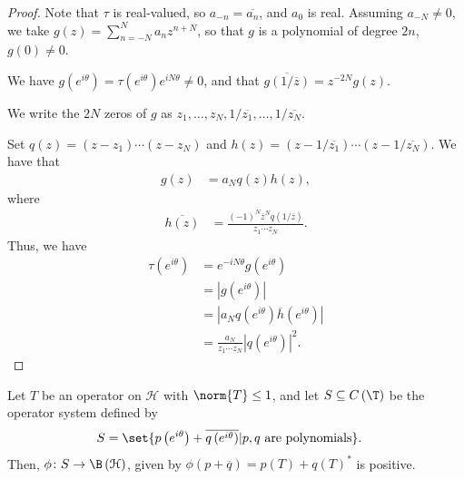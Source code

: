 \documentclass[10pt]{mypackage}
\begin{document}
\begin{proof}
  Note that $\tau$ is real-valued, so $a_{-n} = \overline{a_n}$, and $a_0$ is real. Assuming $a_{-N} \neq 0$, we take $g(z) = \sum_{n=-N}^{N}a_nz^{n+N}$, so that $g$ is a polynomial of degree $2n$, $g(0)\neq 0$.\newline

  We have $g\left( e^{i\theta} \right) = \tau\left( e^{i\theta} \right)e^{iN\theta}\neq 0$, and that $\overline{g\left( 1/\overline{z} \right)} = z^{-2N}g(z)$.\newline

  We write the $2N$ zeros of $g$ as $z_1,\dots,z_N,1/\overline{z_1},\dots,1/\overline{z_N}$.\newline

  Set $q(z) = \left( z-z_1 \right)\cdots \left( z-z_N \right)$ and $h(z) = \left( z-1/\overline{z_1} \right)\cdots \left( z-1/\overline{z_N} \right)$. We have that
  \begin{align*}
    g(z) &= a_Nq(z)h(z),
  \end{align*}
  where
  \begin{align*}
    \overline{h(z)} &= \frac{\left( -1 \right)^N\overline{z}^Nq\left( 1/\overline{z} \right)}{z_1\cdots z_N}.
  \end{align*}
  Thus, we have
  \begin{align*}
    \tau\left( e^{i\theta} \right) &= e^{-iN\theta}g\left( e^{i\theta} \right)\\
                                   &= \left\vert g\left( e^{i\theta} \right) \right\vert\\
                                   &= \left\vert a_Nq\left( e^{i\theta} \right)\overline{h}\left( e^{i\theta} \right) \right\vert\\
                                   &= \frac{a_N}{z_1\cdots z_N}\left\vert q\left( e^{i\theta} \right) \right\vert^2.
  \end{align*}
\end{proof}
\begin{theorem}
  Let $T$ be an operator on $\mathcal{H}$ with $\norm{T}\leq 1$, and let $S\subseteq C\left( \T \right)$ be the operator system defined by
  \begin{align*}
    S &= \set{p\left( e^{i\theta} \right) + \overline{q\left( e^{i\theta} \right)} | p,q\text{ are polynomials}}.
  \end{align*}
  Then, $\phi\colon S\rightarrow \B\left( \mathcal{H} \right)$, given by $\phi\left( p + \overline{q} \right) = p(T) + q(T)^{\ast}$ is positive.
\end{theorem}
\end{document}
